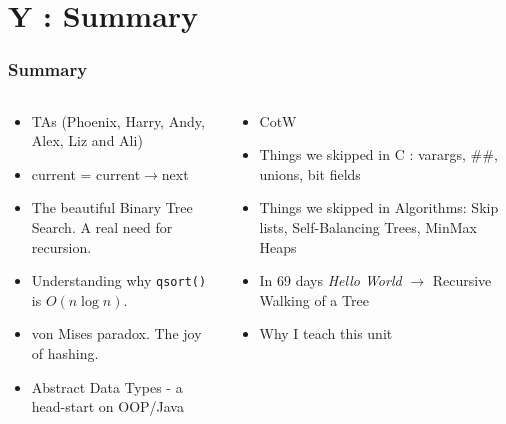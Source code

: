 \section{Y : Summary}
\label{chap:summary}


\begin{frame}[fragile]
\frametitle{Summary}
\begin{columns}[T]

\begin{column}{0.45\textwidth}
\begin{itemize}[<+->]
\item TAs (Phoenix, Harry, Andy, Alex, Liz and Ali)
\item current = current$\rightarrow$next
\item The beautiful Binary Tree Search. A real need for recursion.
\item Understanding why {\tt qsort()} is $O(n \log n)$.
\item von Mises paradox. The joy of hashing.
\item Abstract Data Types - a head-start on OOP/Java
\end{itemize}
\end{column}

\pause
\begin{column}{0.45\textwidth}
\begin{itemize}[<+->]
\item CotW
\item Things we skipped in C : varargs, $\#\#$, unions, bit fields
\item Things we skipped in Algorithms: Skip lists, Self-Balancing Trees, MinMax Heaps
\item In 69 days {\it Hello World} $\rightarrow$ Recursive Walking of a Tree
\item Why I teach this unit
\end{itemize}
\end{column}

\end{columns}
\end{frame}
